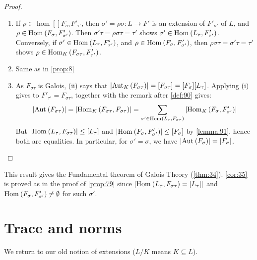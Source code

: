 \begin{proof}
  \begin{enumerate}
  \item If $\rho \in \hom[]{F_{\sigma\tau}}{F'_{\tau'}}$, then $\sigma' = \rho\sigma : L \rightarrow F'$ is an extension of $F'_{\sigma'}$ of $L$, and $\rho \in \homset[]{F_\sigma}{F'_{\sigma'}}$. Then $\sigma'\tau = \rho\sigma\tau = \tau'$ shows $\sigma' \in \homset[]{L_\tau}{F'_{\tau'}}$. Conversely, if $\sigma' \in \homset[]{L_\tau}{F'_{\tau'}}$, and $\rho \in \homset[]{F_\sigma}{F'_{\sigma'}}$, then $\rho\sigma\tau = \sigma'\tau = \tau'$ shows $\rho \in \homset{F_{\sigma\tau}}{F'_{\tau'}}$.
  \item Same as in \autoref{prop:8}
  \item As $F_{\sigma\tau}$ is Galois, (ii) says that $\card{\autset{F_{\sigma\tau}}} = [F_{\sigma\tau}] = [F_\sigma][L_\tau]$. Applying (i) gives to $F'_{\tau'} = F_{\sigma\tau}$, together with the remark after \autoref{def:90} gives:
\[
\card{\autset[]{F_{\sigma\tau}}} = \card{\homset{F_{\sigma\tau}}{F_{\sigma\tau}}} = \sum_{\sigma' \in \homset[]{L_\tau}{F_{\sigma\tau}}} \card{\homset{F_\sigma}{F'_{\sigma'}}}
\]
But $\card{\homset[]{L_\tau}{F_{\sigma\tau}}} \leq [L_\tau]$ and $\card{\homset[]{F_\sigma}{F'_{\sigma'}}} \leq [F_\sigma]$ by \autoref{lemma:91}, hence both are equalities. In particular, for $\sigma' = \sigma$, we have $\card{\autset[]{F_\sigma}} = \card{F_\sigma}$. 
  \end{enumerate}
\end{proof}

This result gives the Fundamental theorem of Galois Theory (\autoref{thm:34}). \autoref{cor:35} is proved as in the proof of \autoref{prop:79} since $\card{\homset[]{L_\tau}{F_{\sigma\tau}} = [L_\tau]}$ and $\homset[]{F_\sigma}{F'_{\sigma'}} \neq \emptyset$ for such $\sigma'$.

\section{Trace and norms}
We return to our old notion of extensions ($L/K$ means $K \subseteq L$).

